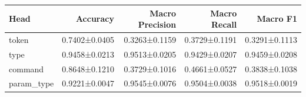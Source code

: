 \begin{tabular}{lrrrr}
\toprule
Head & Accuracy & Macro Precision & Macro Recall & Macro F1 \\
\midrule
token & 0.7402±0.0405 & 0.3263±0.1159 & 0.3729±0.1191 & 0.3291±0.1113 \\
type & 0.9458±0.0213 & 0.9513±0.0205 & 0.9429±0.0207 & 0.9459±0.0208 \\
command & 0.8648±0.1210 & 0.3729±0.1016 & 0.4661±0.0527 & 0.3838±0.1038 \\
param_type & 0.9221±0.0047 & 0.9545±0.0076 & 0.9504±0.0038 & 0.9518±0.0019 \\
\bottomrule
\end{tabular}

